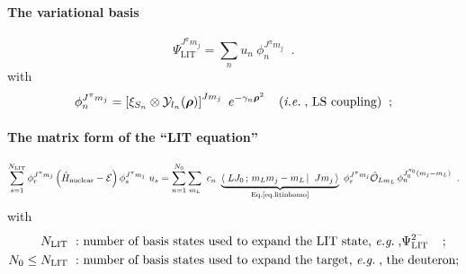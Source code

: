\documentclass[onecolumn,preprint,superscriptaddress,nofootinbib,notitlepage,10pt,linenumbers]{revtex4-1}
\newcommand{\eg}{\textit{e.g.}\;}
\newcommand{\ie}{\textit{i.e.}\;}
\newcommand{\be}{\begin{equation}}
\newcommand{\ee}{\end{equation}}
\newcommand{\la}{\label}
\newcommand{\ve}[1]{\ensuremath{\boldsymbol{#1}}}
\newcommand{\clg}[6]{\ensuremath{\left\langle\left.\,#1#2\,;\,#3#4\,\right\vert\right.\left.\,#5#6\,\right\rangle}}
\newcommand{\E}{\mathcal{E}}
\begin{document}
\paragraph{The variational basis}
\be\la{eq.basis}
\Psi_\text{LIT}^{J^\pi m_j}=\sum\limits_nu_n~\phi^{J^\pi m_j}_n\;\;.
\ee
with
\begin{align}\la{eq.basis.descr}
\phi^{J^\pi m_j}_n=\left[\xi_{S_n}\otimes\mathcal{Y}_{l_n}(\ve{\rho})\right]^{J m_j}~e^{-\gamma_n\ve{\rho}^2}\;\;\;\;(\text{\ie, LS coupling})\;\;;
\end{align}

\paragraph{The matrix form of the ``LIT equation''}
\be\la{eq.liteq.mat}
\sum\limits_{s=1}^{N_\text{LIT}}\phi^{J^\pi m_j}_r\left(\hat{H}_\text{nuclear}-\E\right)\phi^{J^\pi m_j}_s~u_s=
\sum\limits_{n=1}^{N_0}\sum\limits_{m_L}~c_n~\underbrace{\clg{L}{J_0}{m_L}{m_j-m_L}{J}{m_j}}_{\text{Eq.\eqref{eq.litinhomo}}}~\phi^{J^\pi m_j}_r\hat{\mathcal{O}}_{Lm_L}\,\phi^{J_0^{\pi_0}(m_j-m_L)}_n\;\;.
\ee
with
\begin{align}\la{eq.liteq.mat.descr}
N_\text{LIT}~:&~\text{number of basis states used to expand the LIT state, \eg,} \Psi_\text{LIT}^{2^-}\;\;\;\;;\\
N_0\leq N_\text{LIT}~:&~\text{number of basis states used to expand the target, \eg, the deuteron;}\\
\end{align}
\end{document}
